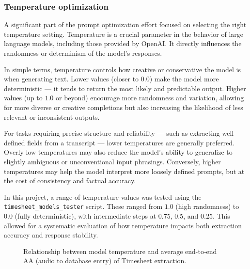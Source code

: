 \documentclass[
  digital,     %
  oneside,     %
  nosansbold,  %
  nocolorbold, %
  lof,         %
  lot,         %
]{fithesis4}
\begin{document}
\subsubsection{Temperature optimization}

A significant part of the prompt optimization effort focused on selecting the right temperature setting. Temperature is a crucial parameter in the behavior of large language models, including those provided by OpenAI. It directly influences the randomness or determinism of the model's responses.

In simple terms, temperature controls how creative or conservative the model is when generating text. Lower values (closer to $0.0$) make the model more deterministic --- it tends to return the most likely and predictable output. Higher values (up to $1.0$ or beyond) encourage more randomness and variation, allowing for more diverse or creative completions but also increasing the likelihood of less relevant or inconsistent outputs.

For tasks requiring precise structure and reliability --- such as extracting well-defined fields from a transcript --- lower temperatures are generally preferred. Overly low temperatures may also reduce the model's ability to generalize to slightly ambiguous or unconventional input phrasings. Conversely, higher temperatures may help the model interpret more loosely defined prompts, but at the cost of consistency and factual accuracy.

In this project, a range of temperature values was tested using the \texttt{timesheet\_models\_tester} script. These ranged from $1.0$ (high randomness) to $0.0$ (fully deterministic), with intermediate steps at $0.75$, $0.5$, and $0.25$. This allowed for a systematic evaluation of how temperature impacts both extraction accuracy and response stability.

\begin{figure}[!h]
    \centering
    \caption{Relationship between model temperature and average end-to-end \gls{AA} (audio to database entry) of Timesheet extraction.}
    \label{fig:temp_vs_accuracy}
\end{figure}
\end{document}
